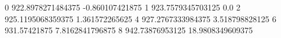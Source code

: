 0 922.8978271484375 -0.860107421875
1 923.7579345703125 0.0
2 925.1195068359375 1.361572265625
4 927.2767333984375 3.518798828125
6 931.57421875 7.8162841796875
8 942.73876953125 18.9808349609375

